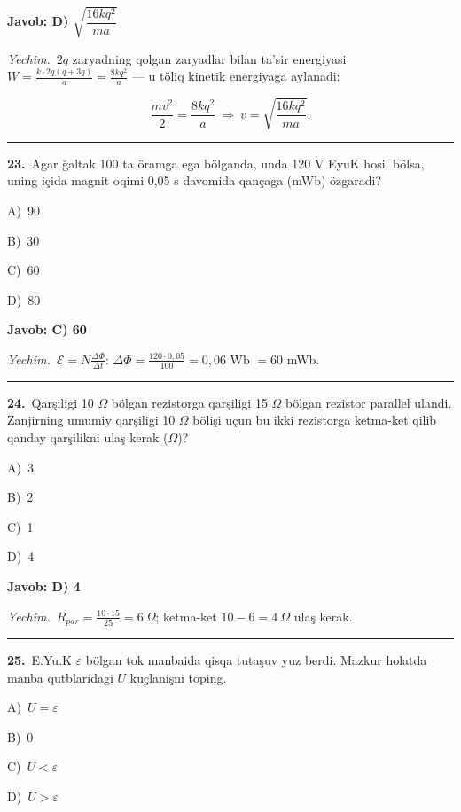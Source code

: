 \documentclass[11pt,a4paper]{article}
\newcommand{\opt}[2]{\hspace*{4mm}#1)\ #2\par}
\begin{document}
\noindent\colorbox{gray!12}{\parbox{\dimexpr\linewidth-2\fboxsep}{\textbf{Javob: D) $\sqrt{\dfrac{16kq^2}{ma}}$}}}\par\smallskip
\noindent\textit{Yechim.}\ $2q$ zaryadning qolgan zaryadlar bilan ta’sir energiyasi $W=\frac{k\cdot2q(q+3q)}{a}=\frac{8kq^2}{a}$ — u töliq kinetik energiyaga aylanadi:\par
\[\frac{mv^2}{2}=\frac{8kq^2}{a}\ \Rightarrow\ v=\sqrt{\frac{16kq^2}{ma}}.\]\par\medskip\hrule\medskip
{}\noindent\begin{minipage}{\linewidth}
\textbf{23.}\ Agar ğaltak 100 ta öramga ega bölganda, unda 120 V EyuK hosil bölsa, uning içida magnit oqimi 0,05 s davomida qançaga (mWb) özgaradi?\par\smallskip
\opt{A}{90}
\opt{B}{30}
\opt{C}{60}
\opt{D}{80}
\end{minipage}\vspace{2pt}\par
\noindent\colorbox{gray!12}{\parbox{\dimexpr\linewidth-2\fboxsep}{\textbf{Javob: C) 60}}}\par\smallskip
\noindent\textit{Yechim.}\ $\mathcal E=N\frac{\Delta\Phi}{\Delta t}$: $\Delta\Phi=\frac{120\cdot0{,}05}{100}=0{,}06$ Wb $=60$ mWb.\par\par\medskip\hrule\medskip
{}\noindent\begin{minipage}{\linewidth}
\textbf{24.}\ Qarşiligi 10 $\Omega$ bölgan rezistorga qarşiligi 15 $\Omega$ bölgan rezistor parallel ulandi. Zanjirning umumiy qarşiligi 10 $\Omega$ bölişi uçun bu ikki rezistorga ketma-ket qilib qanday qarşilikni ulaş kerak ($\Omega$)?\par\smallskip
\opt{A}{3}
\opt{B}{2}
\opt{C}{1}
\opt{D}{4}
\end{minipage}\vspace{2pt}\par
\noindent\colorbox{gray!12}{\parbox{\dimexpr\linewidth-2\fboxsep}{\textbf{Javob: D) 4}}}\par\smallskip
\noindent\textit{Yechim.}\ $R_{par}=\frac{10\cdot15}{25}=6\ \Omega$; ketma-ket $10-6=4\ \Omega$ ulaş kerak.\par\par\medskip\hrule\medskip
{}\noindent\begin{minipage}{\linewidth}
\textbf{25.}\ E.Yu.K $\varepsilon$ bölgan tok manbaida qisqa tutaşuv yuz berdi. Mazkur holatda manba qutblaridagi $U$ kuçlanişni toping.\par\smallskip
\opt{A}{$U=\varepsilon$}
\opt{B}{0}
\opt{C}{$U<\varepsilon$}
\opt{D}{$U>\varepsilon$}
\end{minipage}\vspace{2pt}\par
\end{document}
